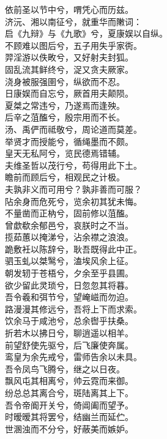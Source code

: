 \documentclass[]{article}
\begin{document}
依前圣以节中兮，喟凭心而历兹。\\
济沅、湘以南征兮，就重华而敶词：\\
启《九辩》与《九歌》兮，夏康娱以自纵。\\
不顾难以图后兮，五子用失乎家衖。\\
羿淫游以佚畋兮，又好射夫封狐。\\
固乱流其鲜终兮，浞又贪夫厥家。\\
浇身被服强圉兮，纵欲而不忍。\\
日康娱而自忘兮，厥首用夫颠陨。\\
夏桀之常违兮，乃遂焉而逢殃。\\
后辛之菹醢兮，殷宗用而不长。\\
汤、禹俨而祗敬兮，周论道而莫差。\\
举贤才而授能兮，循绳墨而不颇。\\
皇天无私阿兮，览民德焉错辅。\\
夫维圣哲以茂行兮，苟得用此下土。\\
瞻前而顾后兮，相观民之计极。\\
夫孰非义而可用兮？孰非善而可服？\\
阽余身而危死兮，览余初其犹未悔。\\
不量凿而正枘兮，固前修以菹醢。\\
曾歔欷余郁邑兮，哀朕时之不当。\\
揽茹蕙以掩涕兮，沾余襟之浪浪。\\
跪敷衽以陈辞兮，耿吾既得此中正。\\
驷玉虬以桀鹥兮，溘埃风余上征。\\
朝发轫于苍梧兮，夕余至乎县圃。\\
欲少留此灵琐兮，日忽忽其将暮。\\
吾令羲和弭节兮，望崦嵫而勿迫。\\
路漫漫其修远兮，吾将上下而求索。\\
饮余马于咸池兮，总余辔乎扶桑。\\
折若木以拂日兮，聊逍遥以相羊。\\
前望舒使先驱兮，后飞廉使奔属。\\
鸾皇为余先戒兮，雷师告余以未具。\\
吾令凤鸟飞腾兮，继之以日夜。\\
飘风屯其相离兮，帅云霓而来御。\\
纷总总其离合兮，斑陆离其上下。\\
吾令帝阍开关兮，倚阊阖而望予。\\
时暧暧其将罢兮，结幽兰而延伫。\\
世溷浊而不分兮，好蔽美而嫉妒。\\
\end{document}

